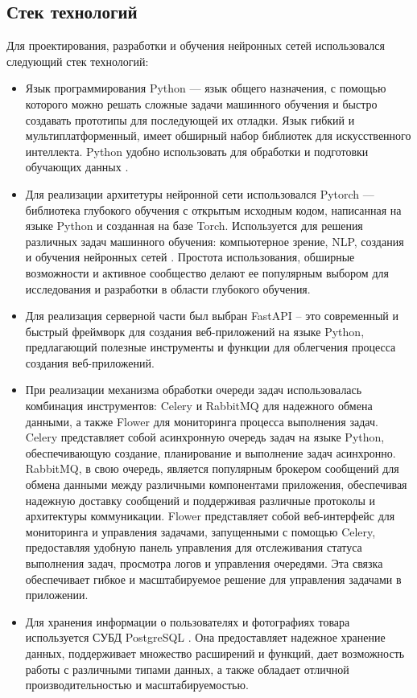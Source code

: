\documentclass[a4paper,12pt]{extarticle}
\begin{document}
\subsection{Стек технологий}\label{stack-tech}
Для проектирования, разработки и обучения нейронных сетей использовался следующий стек технологий:
\begin{itemize}
	\item Язык программирования Python — язык общего назначения, с помощью которого можно решать сложные задачи машинного обучения и быстро создавать прототипы для последующей их отладки. Язык гибкий и мультиплатформенный, имеет обширный набор библиотек для искусственного интеллекта. Python удобно использовать для обработки и подготовки обучающих данных \cite{pyton}.
	\item Для реализации архитетуры нейронной сети использовался Pytorch — библиотека глубокого обучения с открытым исходным кодом, написанная на языке Python и созданная на базе Torch. Используется для решения различных задач машинного обучения: компьютерное зрение, NLP, создания и обучения нейронных сетей \cite{pytorch}. Простота использования, обширные возможности и активное сообщество делают ее популярным выбором для исследования и разработки в области глубокого обучения.
	\item Для реализация серверной части был выбран FastAPI – это современный и быстрый фреймворк для создания веб-приложений на языке Python, предлагающий полезные инструменты и функции для облегчения процесса создания веб-приложений\cite{fastapi}.
	\item При реализации механизма обработки очереди задач использовалась комбинация инструментов: Celery\cite{celery} и RabbitMQ\cite{rabbitmq} для надежного обмена данными, а также Flower для мониторинга процесса выполнения задач. Celery представляет собой асинхронную очередь задач на языке Python, обеспечивающую создание, планирование и выполнение задач асинхронно. RabbitMQ, в свою очередь, является популярным брокером сообщений для обмена данными между различными компонентами приложения, обеспечивая надежную доставку сообщений и поддерживая различные протоколы и архитектуры коммуникации. Flower представляет собой веб-интерфейс для мониторинга и управления задачами, запущенными с помощью Celery, предоставляя удобную панель управления для отслеживания статуса выполнения задач, просмотра логов и управления очередями. Эта связка обеспечивает гибкое и масштабируемое решение для управления задачами в приложении.
	\item Для хранения информации о пользователях и фотографиях товара используется СУБД PostgreSQL \cite{postgresql}. Она предоставляет надежное хранение данных, поддерживает множество расширений и функций, дает возможность работы с различными типами данных, а также обладает отличной производительностью и масштабируемостью.

\end{itemize}
\end{document}
